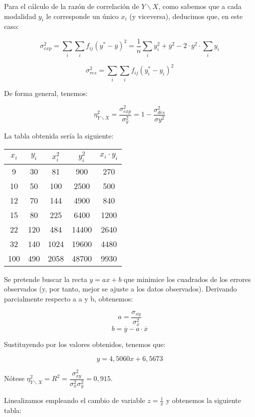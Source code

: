 Para el cálculo de la razón de correlación de $Y\backslash X$, como sabemos que a cada modalidad $y_i$ le corresponde un único $x_i$ (y viceversa), deducimos que, en este caso:

$$\sigma_{exp}^2 = \sum_{i}\sum_{i}f_{ij}(y^*-\overline{y})^2 = \frac{1}{n}\sum_{i}y_i^2 + \overline y^2 - 2·\overline y^2·\sum_{i}y_i$$

$$\sigma_{res}^2 = \sum_{i}\sum_{i}f_{ij}(y_i^*-y_i)^2$$

De forma general, tenemos:

$$\eta_{Y\backslash X}^2 = \frac{\sigma_{exp}^2}{\sigma_{y}^2} = 1 - \frac{\sigma_{des}^2}{\sigma{y}^2}$$

\subproblem

La tabla obtenida sería la siguiente: 

\begin{center}
	\begin{tabular}{ c|c|c|c|c }
	
	$x_i$ & $y_i$ & $x_i^2$ & $y_i^2$ & $x_i·y_i$ \\ \hline
	9 & 30 & 81 & 900 & 270 \\ 
	10 & 50 & 100 & 2500 & 500 \\ 
	12 & 70 & 144 & 4900 & 840 \\ 
	15 & 80 & 225 & 6400 & 1200 \\ 
	22 & 120 & 484 & 14400 & 2640 \\ 
	32 & 140 & 1024 & 19600 & 4480 \\ \hline
	100 & 490 & 2058 & 48700 & 9930 \\ 
\end{tabular}
\end{center}

Se pretende buscar la recta $y = ax + b$ que minimice los cuadrados de los errores observados (y, por tanto, mejor se ajuste a los datos observados). Derivando parcialmente respecto a a y b, obtenemos: 

$$a = \frac{\sigma_{xy}}{\sigma_x^2}$$
$$b = \overline{y} - a·\overline{x}$$

Sustituyendo por los valores obtenidos, tenemos que:

$$y=4,5060x+6,5673$$

Nótese $\eta_{Y\backslash X}^2 = R^2 = \dfrac{\sigma_{xy}^2}{\sigma_x^2\sigma_y^2}=0,915$.

\subproblem

Linealizamos empleando el cambio de variable $z=\frac{1}{x}$ y obtenemos la siguiente tabla: 

